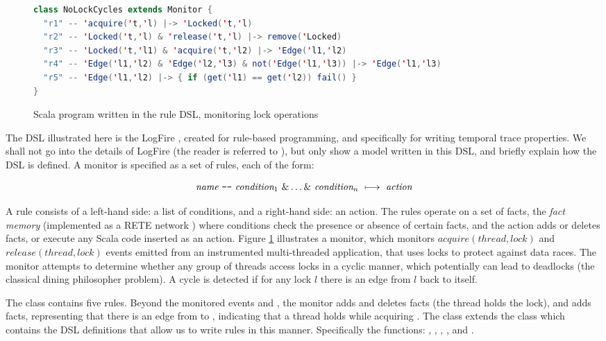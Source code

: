 \begin{figure}
\begin{lstlisting}[language=scala,frame=single]
class NoLockCycles extends Monitor {
  "r1" -- 'acquire('t,'l) |-> 'Locked('t,'l)
  "r2" -- 'Locked('t,'l) & 'release('t,'l) |-> remove('Locked)
  "r3" -- 'Locked('t,'l1) & 'acquire('t,'l2) |-> 'Edge('l1,'l2)
  "r4" -- 'Edge('l1,'l2) & 'Edge('l2,'l3) & not('Edge('l1,'l3)) |-> 'Edge('l1,'l3)
  "r5" -- 'Edge('l1,'l2) |-> { if (get('l1) == get('l2)) fail() }
}
\end{lstlisting}
\caption{Scala program written in the rule DSL, 
monitoring lock operations}
\label{fig:deadlocks-scala}
\end{figure}

The DSL illustrated here is the LogFire \cite{havelund-logfire-sttt14},
created for rule-based programming, and specifically for 
writing temporal trace properties. We shall not go into the details of LogFire (the reader is referred to \cite{havelund-logfire-sttt14}), but only show a model written in this DSL, 
and briefly explain how the DSL is defined. 
A monitor is specified as a set of rules, each of the form: 

\[
  \textit{name}\ \verb+--+\ \textit{condition}_1\ \& \ldots \&\ \textit{condition}_n\ \longmapsto\  \textit{action}
\]

\noindent
A rule consists of a left-hand side: a list of conditions, and a 
right-hand side:
an action. The rules operate on a set of facts, the 
{\em fact memory} (implemented as a RETE network \cite{forgy-rete-82}) 
where conditions check the presence or absence of certain facts, 
and the action adds or deletes 
facts, or execute any Scala code inserted as an action. Figure 
\ref{fig:deadlocks-scala} illustrates 
a monitor, which monitors $acquire(thread,lock)$ and 
$release(thread,lock)$ events emitted from an instrumented 
multi-threaded application, that uses locks to protect against
data races. The monitor attempts to determine whether any 
group of threads access locks
in a cyclic manner, which potentially can lead to deadlocks (the classical dining philosopher problem). 
A cycle is detected if for any lock $l$ there is 
an edge from $l$ back to itself.

The class contains five rules. Beyond the monitored events
 and , the monitor adds 
and deletes  facts (the thread holds
the lock), and adds  facts, representing
that there is an edge from  to , indicating that a thread holds   while acquiring
. The class extends the  class which contains the DSL definitions that allow us to write rules in this manner. Specifically the functions: \iscala{--}, \iscala{&}, \iscala{|->}, , and . 

